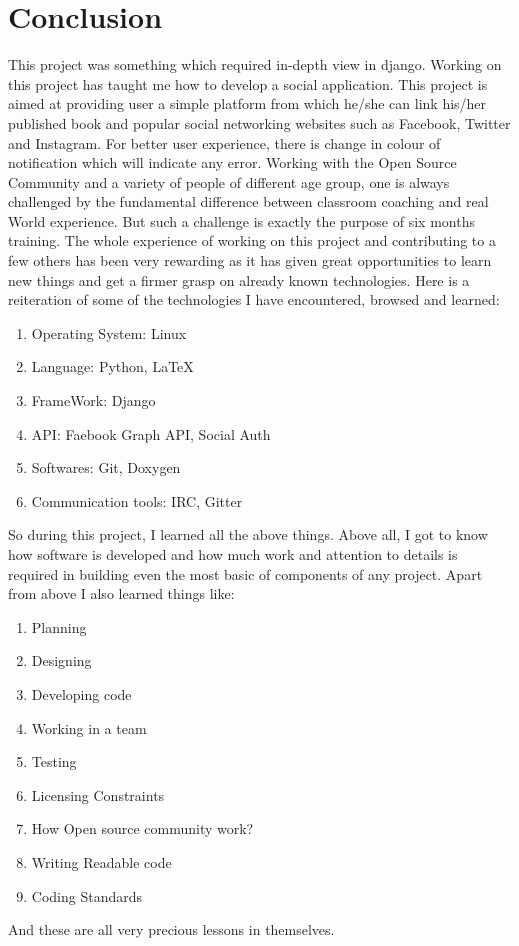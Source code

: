 \section{Conclusion}

This project was something which required in-depth view in django. Working on this project has taught me how to develop a social application. This project is  aimed at providing user a simple platform from which he/she can link his/her published book and popular social networking websites such as Facebook, Twitter and Instagram. For better user experience, there is change in colour of notification which will indicate any error. Working with the Open Source Community and a variety of people of different age group, one is always challenged by the fundamental difference between classroom coaching and real World experience. But such a challenge is exactly the purpose of six months training. The whole experience of working on this project and contributing to a few others has been very rewarding as it has given great opportunities to learn new things and get a firmer grasp on already known technologies. Here is a reiteration of some of the technologies I have encountered, browsed and learned:

\begin{enumerate}
    \item Operating System: Linux
    \item Language: Python, \LaTeX
    \item FrameWork: Django
    \item API: Faebook Graph API, Social Auth
    \item Softwares: Git, Doxygen
    \item Communication tools: IRC, Gitter
\end{enumerate}
So during this project, I learned all the above things. Above all, I got to know how software is
developed and how much work and attention to details is required in building even the most basic
of components of any project. Apart from above I also learned things like:
\begin{enumerate}
    \item Planning
    \item Designing
    \item Developing code
    \item Working in a team
    \item Testing
    \item Licensing Constraints
    \item How Open source community work?
    \item Writing Readable code
    \item Coding Standards
\end{enumerate}
And these are all very precious lessons in themselves.

